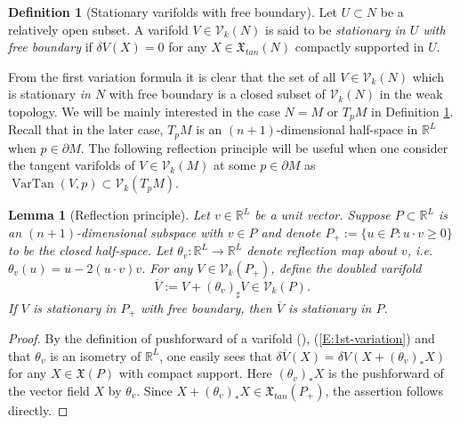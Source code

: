 \documentclass[10pt]{amsart}
\newtheorem{lemma}[theorem]{Lemma}
\theoremstyle{definition}
\newtheorem{definition}[theorem]{Definition}
\theoremstyle{remark}
\numberwithin{equation}{section}
\newcommand{\V}{\mathcal{V}}
\newcommand{\tM}{\widetilde{M}}
\newcommand{\VarTan}{\operatorname{VarTan}}
\begin{document}
\begin{definition}[Stationary varifolds with free boundary]
\label{D:freebdy}
Let $U \subset N$ be a relatively open subset. A varifold $V\in\V_k(N)$ is said to be \emph{stationary in $U$ with free boundary} if $\delta V(X) =0$ for any $X \in \mathfrak{X}_{tan}(N)$ compactly supported in $U$. 
\end{definition}

From the first variation formula it is clear that the set of all $V \in \V_k(N)$ which is stationary \emph{in $N$} with free boundary is a closed subset of $\V_k(N)$ in the weak topology. 
We will be mainly interested in the case $N=M$ or $T_pM$ in Definition \ref{D:freebdy}. Recall that in the later case, $T_pM$ is an $(n+1)$-dimensional half-space in $\mathbb{R}^L$ when $p \in \partial M$. The following reflection principle will be useful when one consider the tangent varifolds of $V \in \V_k(M)$ at some $p \in \partial M$ as $\VarTan(V,p) \subset \V_k(T_pM)$.

\begin{lemma}[Reflection principle]
\label{L:reflection}
Let $v \in \mathbb{R}^L$ be a unit vector. Suppose $P \subset \mathbb{R}^L$ is an $(n+1)$-dimensional subspace with $v\in P$ and denote $P_+:=\{u \in P: u \cdot v \geq 0\}$ to be the closed half-space. Let $\theta_v: \mathbb{R}^L \to \mathbb{R}^L$ denote reflection map about $v$, i.e. $\theta_v(u)=u - 2 (u \cdot v) v$. For any $V \in \V_k(P_+)$, define the doubled varifold
\begin{equation}
\label{E:double-varifold}
\overline{V}:=V+(\theta_v)_\sharp V \in \V_k(P).
\end{equation}
If $V$ is stationary in $P_+$ with free boundary, then $\overline{V}$ is stationary in $P$.
\end{lemma}

\begin{proof}
By the definition of pushforward of a varifold (\cite[\S 39]{Simon}), (\ref{E:1st-variation}) and that $\theta_v$ is an isometry of $\mathbb{R}^L$, one easily sees that $\delta \overline{V} (X)=  \delta V (X + (\theta_v)_* X)$ for any $X \in \mathfrak{X}(P)$ with compact support. Here $(\theta_v)_*X$ is the pushforward of the vector field $X$ by $\theta_v$. Since $X + (\theta_v)_* X \in \mathfrak{X}_{tan}(P_+)$, the assertion follows directly.
\end{proof}
\end{document}
